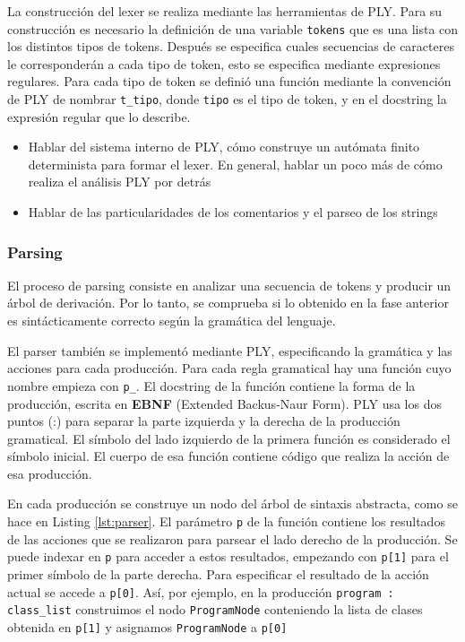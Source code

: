 \documentclass[11pt]{scrartcl} %
\begin{document}
La construcción del lexer se realiza mediante las herramientas de PLY. Para su construcción es necesario la definición de una variable \texttt{tokens} que es una lista con los distintos tipos de tokens. Después se especifica cuales secuencias de caracteres le corresponderán a cada tipo de token, esto se especifica mediante expresiones regulares. Para cada tipo de token se definió una función mediante la convención de PLY de nombrar \texttt{t\_tipo}, donde \texttt{tipo} es el tipo de token, y en el docstring la expresión regular que lo describe.

\begin{itemize}
	\item Hablar del sistema interno de PLY, cómo construye un autómata finito determinista para formar el lexer. En general, hablar un poco más de cómo realiza el análisis PLY por detrás
	\item Hablar de las particularidades de los comentarios y el parseo de los strings
\end{itemize}

\subsubsection{Parsing}

El proceso de parsing consiste en analizar una secuencia de tokens y producir un árbol de derivación. Por lo tanto, se comprueba si lo obtenido en la fase anterior es sintácticamente correcto según la gramática del lenguaje.

El parser también se implementó mediante PLY, especificando la gramática y las acciones para cada producción. Para cada regla gramatical hay una función cuyo nombre empieza con \texttt{p\_}. El docstring de la función contiene la forma de la producción, escrita en \textbf{EBNF} (Extended Backus-Naur Form). PLY usa los dos puntos (:) para separar la parte izquierda y la derecha de la producción gramatical. El símbolo del lado izquierdo de la primera función es considerado el símbolo inicial. El cuerpo de esa función contiene código que realiza la acción de esa producción.

En cada producción se construye un nodo del árbol de sintaxis abstracta, como se hace en Listing \ref{lst:parser}. El parámetro \texttt{p} de la función contiene los resultados de las acciones que se realizaron para parsear el lado derecho de la producción. Se puede indexar en \texttt{p} para acceder a estos resultados, empezando con \texttt{p[1]} para el primer símbolo de la parte derecha. Para especificar el resultado de la acción actual se accede a \texttt{p[0]}. Así, por ejemplo, en la producción \texttt{program : class\_list} construimos el nodo \texttt{ProgramNode} conteniendo la lista de clases obtenida en \texttt{p[1]} y asignamos \texttt{ProgramNode} a \texttt{p[0]}
\end{document}
